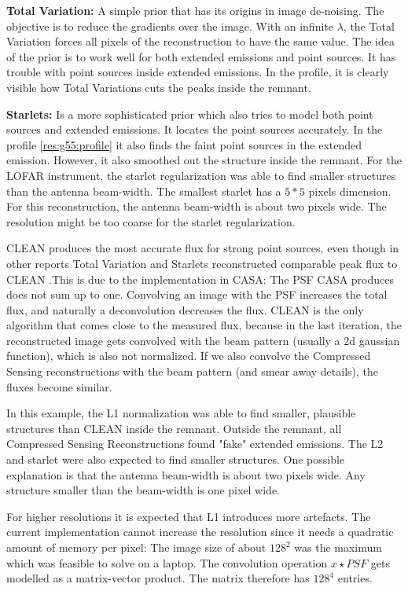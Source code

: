 \textbf{Total Variation:} A simple prior that has its origins in image de-noising. The objective is to reduce the gradients over the image. With an infinite $\lambda$, the Total Variation forces all pixels of the reconstruction to have the same value. The idea of the prior is to work well for both extended emissions and point sources. It has trouble with point sources inside extended emissions. In the profile, it is clearly visible how Total Variations cuts the peaks inside the remnant.

\textbf{Starlets:} Is a more sophisticated prior which also tries to model both point sources and extended emissions. It locates the point sources accurately. In the profile \ref{res:g55:profile} it also finds the faint point sources in the extended emission. However, it also smoothed out the structure inside the remnant. For the LOFAR instrument, the starlet regularization was able to find smaller structures than the antenna beam-width\cite{girard2015sparse}. The smallest starlet has a $5*5$ pixels dimension. For this reconstruction, the antenna beam-width is about two pixels wide. The resolution might be too coarse for the starlet regularization.

CLEAN produces the most accurate flux for strong point sources, even though in other reports Total Variation and Starlets reconstructed comparable peak flux to CLEAN \cite{garsden2015lofar}\cite{mcewen2011compressed}.This is due to the implementation in CASA: The PSF CASA produces does not sum up to one. Convolving an image with the PSF increases the total flux, and naturally a deconvolution decreases the flux. CLEAN is the only algorithm that comes close to the measured flux, because in the last iteration, the reconstructed image gets convolved with the beam pattern (usually a 2d gaussian function), which is also not normalized. If we also convolve the Compressed Sensing reconstructions with the beam pattern (and smear away details), the fluxes become similar.

In this example, the L1 normalization was able to find smaller, plausible structures than CLEAN inside the remnant. Outside the remnant, all Compressed Sensing Reconstructions found "fake" extended emissions. The L2 and starlet were also expected to find smaller structures. One possible explanation is that the antenna beam-width is about two pixels wide. Any structure smaller than the beam-width is one pixel wide.

For higher resolutions it is expected that L1 introduces more artefacts. The current implementation cannot increase the resolution since it needs a quadratic amount of memory per pixel: The image size of about $128^2$ was the maximum which was feasible to solve on a laptop. The convolution operation $x \star PSF$ gets modelled as a matrix-vector product. The matrix therefore has $128^4$ entries.

